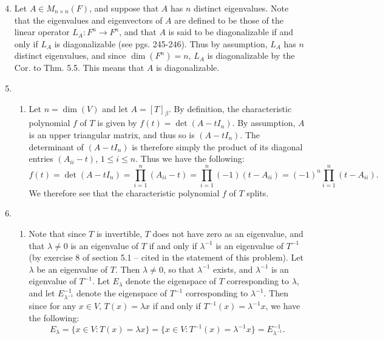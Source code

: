 \documentclass[12pt]{article}
\begin{document}
\begin{enumerate}
\setcounter{enumi}{3}
\item
Let $A \in M_{n \times n}(F)$, and suppose that $A$ has $n$ distinct eigenvalues. Note that the eigenvalues and eigenvectors of $A$ are defined to be those of the linear operator $L_A : F^n \to F^n$, and that $A$ is said to be diagonalizable if and only if $L_A$ is diagonalizable (see pgs. 245-246). Thus by assumption, $L_A$ has $n$ distinct eigenvalues, and since $\dim(F^n) = n$, $L_A$ is diagonalizable by the Cor. to Thm. 5.5. This means that $A$ is diagonalizable.

\setcounter{enumi}{8}
\item
\begin{enumerate}
\item
Let $n = \dim(V)$ and let $A = [T]_\beta$. By definition, the characteristic polynomial $f$ of $T$ is given by $f(t) = \det(A - tI_n)$. By assumption, $A$ is an upper triangular matrix, and thus so is $(A - tI_n)$. The determinant of $(A - tI_n)$ is therefore simply the product of its diagonal entries $(A_{ii} - t)$, $1 \leq i \leq n$. Thus we have the following:
\begin{equation*}
f(t) = \det(A - tI_n) = \prod_{i=1}^n (A_{ii} - t) = \prod_{i=1}^n (-1)(t - A_{ii}) = (-1)^n \prod_{i=1}^n (t - A_{ii}).
\end{equation*}
We therefore see that the characteristic polynomial $f$ of $T$ splits.

\end{enumerate}
\setcounter{enumi}{11}
\item
\begin{enumerate}
\item
Note that since $T$ is invertible, $T$ does not have zero as an eigenvalue, and that $\lambda \neq 0$ is an eigenvalue of $T$ if and only if $\lambda^{-1}$ is an eigenvalue of $T^{-1}$ (by exercise 8 of section 5.1 -- cited in the statement of this problem). Let $\lambda$ be an eigenvalue of $T$. Then $\lambda \neq 0$, so that $\lambda^{-1}$ exists, and $\lambda^{-1}$ is an eigenvalue of $T^{-1}$. Let $E_\lambda$ denote the eigenspace of $T$ corresponding to $\lambda$, and let $E^{-1}_{\lambda^{-1}}$ denote the eigenspace of $T^{-1}$ corresponding to $\lambda^{-1}$. Then since for any $x \in V$, $T(x) = \lambda x$ if and only if $T^{-1}(x) = \lambda^{-1} x$, we have the following:
\begin{equation*}
E_\lambda = \{x \in V : T(x) = \lambda x\} = \{x \in V : T^{-1}(x) = \lambda^{-1} x\} = E^{-1}_{\lambda^{-1}}.
\end{equation*}


\end{enumerate}
\end{enumerate}
\end{document}

